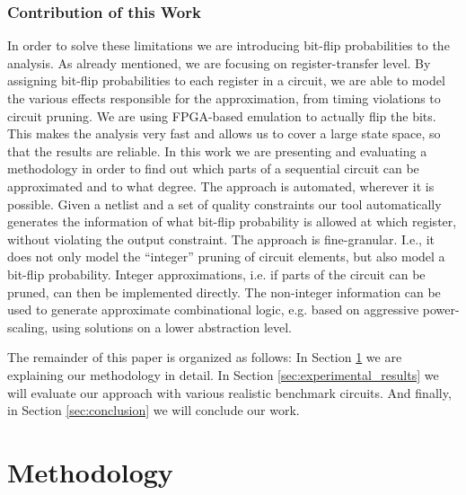 \documentclass[conference]{IEEEtran}
\begin{document}
\subsubsection*{Contribution of this Work}
In order to solve these limitations we are introducing bit-flip probabilities to the analysis. As already mentioned, we are focusing on register-transfer level. By assigning bit-flip probabilities to each register in a circuit, we are able to model the various effects responsible for the approximation, from timing violations to circuit pruning. We are using FPGA-based emulation to actually flip the bits. This makes the analysis very fast and allows us to cover a large state space, so that the results are reliable. In this work we are presenting and evaluating a methodology in order to find out which parts of a sequential circuit can be approximated and to what degree. The approach is automated, wherever it is possible. Given a netlist and a set of quality constraints our tool automatically generates the information of what bit-flip probability is allowed at which register, without violating the output constraint. The approach is fine-granular. I.e., it does not only model the ``integer'' pruning of circuit elements, but also model a bit-flip probability. Integer approximations, i.e. if parts of the circuit can be pruned, can then be implemented directly. The non-integer information can be used to generate approximate combinational logic, e.g. based on aggressive power-scaling, using solutions on a lower abstraction level.

The remainder of this paper is organized as follows: In Section \ref{sec:methodology} we are explaining our methodology in detail. In Section \ref{sec:experimental_results} we will evaluate our approach with various realistic benchmark circuits. And finally, in Section \ref{sec:conclusion} we will conclude our work.



\section{Methodology}
\label{sec:methodology}
\end{document}
